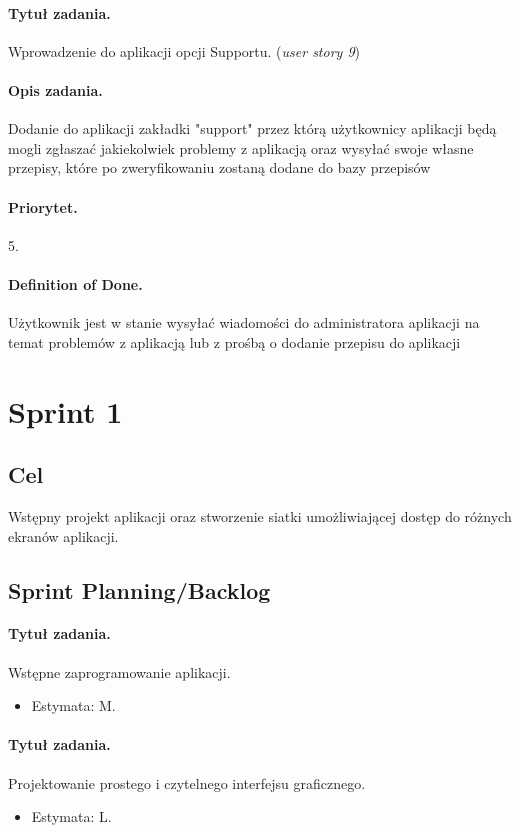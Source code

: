 \documentclass[a4paper]{article}
\begin{document}
	\paragraph{Tytuł zadania.} Wprowadzenie do aplikacji opcji Supportu. (\textit{user story 9})
	\paragraph{Opis zadania.} Dodanie do aplikacji zakładki "support" przez którą użytkownicy aplikacji będą mogli zgłaszać jakiekolwiek problemy z aplikacją oraz wysyłać swoje własne przepisy, które po zweryfikowaniu zostaną dodane do bazy przepisów
	\paragraph{Priorytet.} 5.
	\paragraph{Definition of Done.} Użytkownik jest w stanie wysyłać wiadomości do administratora aplikacji na temat problemów z aplikacją lub z prośbą o dodanie przepisu do aplikacji
	
	
	\section{Sprint 1}
	\subsection{Cel} Wstępny projekt aplikacji oraz stworzenie siatki umożliwiającej dostęp do różnych ekranów aplikacji.
	\subsection{Sprint Planning/Backlog}
	
	\paragraph{Tytuł zadania.} Wstępne zaprogramowanie aplikacji.
	\begin{itemize}
		\item Estymata: M.
	\end{itemize}
	
	\paragraph{Tytuł zadania.} Projektowanie prostego i czytelnego interfejsu graficznego.
	\begin{itemize}
		\item Estymata: L.
	\end{itemize}
	
\end{document}
